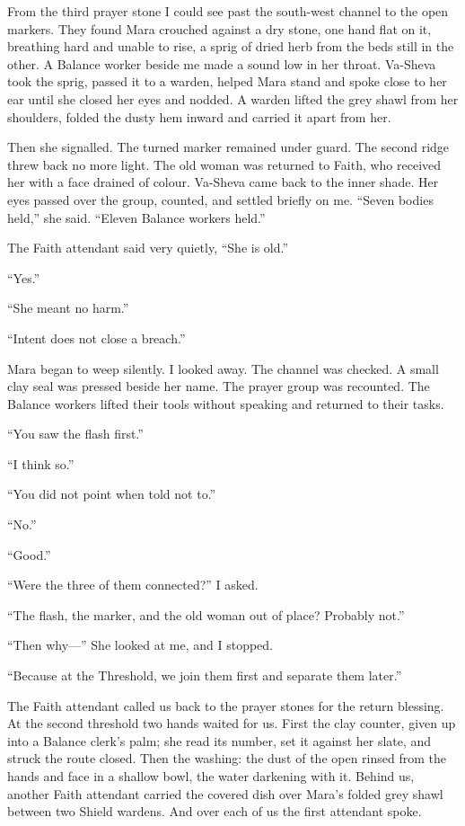 From the third prayer stone I could see past the south-west channel to the open markers. They found Mara crouched against a dry stone, one hand flat on it, breathing hard and unable to rise, a sprig of dried herb from the beds still in the other. A Balance worker beside me made a sound low in her throat. Va-Sheva took the sprig, passed it to a warden, helped Mara stand and spoke close to her ear until she closed her eyes and nodded. A warden lifted the grey shawl from her shoulders, folded the dusty hem inward and carried it apart from her.\par

Then she signalled. The turned marker remained under guard. The second ridge threw back no more light. The old woman was returned to Faith, who received her with a face drained of colour. Va-Sheva came back to the inner shade. Her eyes passed over the group, counted, and settled briefly on me. ``Seven bodies held,'' she said. ``Eleven Balance workers held.''\par

The Faith attendant said very quietly, ``She is old.''\par
``Yes.''\par
``She meant no harm.''\par
``Intent does not close a breach.''\par

Mara began to weep silently. I looked away. The channel was checked. A small clay seal was pressed beside her name. The prayer group was recounted. The Balance workers lifted their tools without speaking and returned to their tasks.\par

``You saw the flash first.''\par
``I think so.''\par
``You did not point when told not to.''\par
``No.''\par
``Good.''\par
``Were the three of them connected?'' I asked.\par
``The flash, the marker, and the old woman out of place? Probably not.''\par
``Then why---'' She looked at me, and I stopped. \par
``Because at the Threshold, we join them first and separate them later.''

\ornament

The Faith attendant called us back to the prayer stones for the return blessing. At the second threshold two hands waited for us. First the clay counter, given up into a Balance clerk's palm; she read its number, set it against her slate, and struck the route closed. Then the washing: the dust of the open rinsed from the hands and face in a shallow bowl, the water darkening with it. Behind us, another Faith attendant carried the covered dish over Mara's folded grey shawl between two Shield wardens. And over each of us the first attendant spoke.\par

